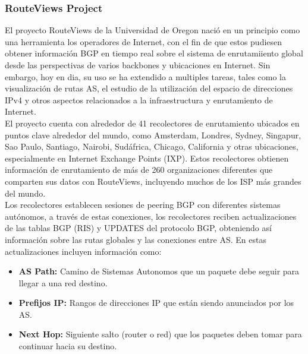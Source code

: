 \subsubsection{RouteViews Project} \label{sec:anexo_routeviews_project}


El proyecto RouteViews \cite{RouteViewsProject} de la Universidad de Oregon nació en un principio como una herramienta los operadores de Internet, 
con el fin de que estos pudiesen obtener información BGP en tiempo real sobre el sistema de enrutamiiento global desde las perspectivas de varios 
backbones y ubicaciones en Internet. Sin embargo, hoy en dia, su uso se ha extendido a multiples tareas, tales como la visualización de rutas AS, 
el estudio de la utilización del espacio de direcciones IPv4 y  otros aspectos relacionados a la infraestructura y enrutamiento de Internet. \\

El proyecto cuenta con alrededor de 41  recolectores de enrutamiento ubicados en puntos clave alrededor del mundo, como Amsterdam, Londres, Sydney, 
Singapur, Sao Paulo, Santiago, Nairobi, Sudáfrica, Chicago, California y otras ubicaciones, especialmente en Internet Exchange Points (IXP). 
Estos recolectores obtienen información de enrutamiento de más de 260 organizaciones diferentes que comparten sus datos  con RouteViews, incluyendo 
muchos de los ISP más grandes del mundo.\\

Los recolectores establecen sesiones de peering BGP con diferentes sistemas autónomos, a través de estas conexiones, los recolectores reciben 
actualizaciones de las tablas BGP (RIS) y UPDATES del protocolo BGP, obteniendo así información sobre las rutas globales y las conexiones entre AS.
En estas actualizaciones incluyen información como:
\begin{itemize}
    \item \textbf{AS Path:} Camino de Sistemas Autonomos que un paquete debe seguir para llegar a una red destino.
    \item \textbf{Prefijos IP:} Rangos de direcciones IP que están siendo anunciados por los AS.
    \item \textbf{Next Hop:} Siguiente salto (router o red) que los paquetes deben tomar para continuar hacia su destino.
\end{itemize}


